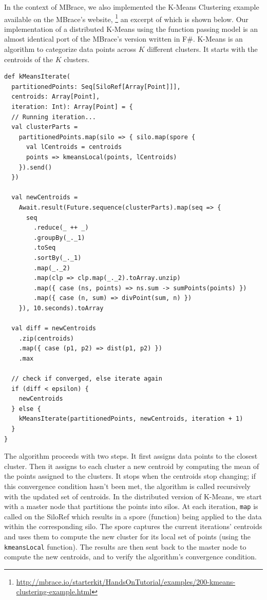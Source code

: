 \documentclass{jfp1}
\begin{document}
In the context of MBrace, we also implemented the K-Means Clustering example
available on the MBrace's website,
\footnote{\url{http://mbrace.io/starterkit/HandsOnTutorial/examples/200-kmeans-clustering-example.html}}
an excerpt of which is shown below. Our implementation of a distributed K-Means
using the function passing model is an almost identical port of the MBrace’s
version written in F\#. K-Means is an algorithm to categorize data points across
$K$ different clusters. It starts with the centroids of the $K$ clusters.

\begin{lstlisting}
def kMeansIterate(
  partitionedPoints: Seq[SiloRef[Array[Point]]],
  centroids: Array[Point],
  iteration: Int): Array[Point] = {
  // Running iteration...
  val clusterParts =
    partitionedPoints.map(silo => { silo.map(spore {
      val lCentroids = centroids
      points => kmeansLocal(points, lCentroids)
    }).send()
  })

  val newCentroids =
    Await.result(Future.sequence(clusterParts).map(seq => {
      seq
        .reduce(_ ++ _)
        .groupBy(_._1)
        .toSeq
        .sortBy(_._1)
        .map(_._2)
        .map(clp => clp.map(_._2).toArray.unzip)
        .map({ case (ns, points) => ns.sum -> sumPoints(points) })
        .map({ case (n, sum) => divPoint(sum, n) })
    }), 10.seconds).toArray

  val diff = newCentroids
    .zip(centroids)
    .map({ case (p1, p2) => dist(p1, p2) })
    .max

  // check if converged, else iterate again
  if (diff < epsilon) {
    newCentroids
  } else {
    kMeansIterate(partitionedPoints, newCentroids, iteration + 1)
  }
}
\end{lstlisting}
The algorithm proceeds with two steps. It first assigns data points to the
closest cluster. Then it assigns to each cluster a new centroid by computing the
mean of the points assigned to the clusters. It stops when the centroids stop
changing; if this convergence condition hasn't been met, the algorithm is called
recursively with the updated set of centroids. In the distributed version of
K-Means, we start with a master node that partitions the points into silos. At
each iteration, \verb|map| is called on the SiloRef which results in a spore
(function) being applied to the data within the corresponding silo. The spore
captures the current iterations' centroids and uses them to compute the new
cluster for its local set of points (using the \verb|kmeansLocal| function). The
results are then sent back to the master node to compute the new centroids, and
to verify the algorithm's convergence condition.
\end{document}
